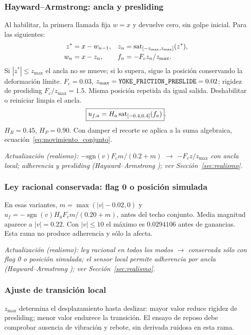 \subsubsection{Hayward--Armstrong: ancla y presliding}
Al habilitar, la primera llamada fija $w=x$ y devuelve cero, sin golpe inicial. Para las siguientes:
\begin{align}
z^*&=x-w_{n-1},& z_n&=\operatorname{sat}_{[-z_{\max},z_{\max}]}(z^*),\\
w_n&=x-z_n,&f_n&=-F_cz_n/z_{\max}.
\label{eq:friccion_magnitud}
\end{align}
Si $|z^*|\le z_{\max}$ el ancla no se mueve; si lo supera, sigue la posición conservando la deformación límite. $F_c=0.03$, $z_{\max}=\code{YOKE_FRICTION_PRESLIDE}=0.02$; rigidez de presliding $F_c/z_{\max}=1.5$. Misma posición repetida da igual salida. Deshabilitar o reiniciar limpia el ancla.
\begin{equation}\boxed{u_{f,a}=H_a\operatorname{sat}_{[-0.4,0.4]}(f_a)}.\label{eq:friccion_aislada}\end{equation}
$H_R=0.45$, $H_P=0.90$. Con damper el recorte se aplica a la suma algebraica, ecuación~\ref{eq:movimiento_conjunto}.


\textit{Actualización (realismo): $-\mathrm{sgn}(v)F_cm/(0.2+m)$ $\rightarrow$ $-F_cz/z_{\max}$ con ancla local; adherencia y presliding (Hayward--Armstrong \cite{hayward2000}); ver Sección~\ref{sec:realismo}.}

\subsubsection{Ley racional conservada: flag 0 o posición simulada}
En esas variantes, $m=\max(|v|-0.02,0)$ y $u_f=-\operatorname{sgn}(v)H_aF_cm/(0.20+m)$, antes del techo conjunto. Media magnitud aparece a $|v|=0.22$. Con $|v|\le10$ el máximo es $0.0294106$ antes de ganancias. Esta rama no produce adherencia y  sólo la afecta.


\textit{Actualización (realismo): ley racional en todos los modos $\rightarrow$ conservada sólo con flag 0 o posición simulada; el sensor local permite adherencia por ancla (Hayward--Armstrong \cite{hayward2000}); ver Sección~\ref{sec:realismo}.}

\subsubsection{Ajuste de transición local}
$z_{\max}$ determina el desplazamiento hasta deslizar: mayor valor reduce rigidez de presliding; menor valor endurece la transición. El ensayo de reposo debe comprobar ausencia de vibración y rebote, sin derivada ruidosa en esta rama.

